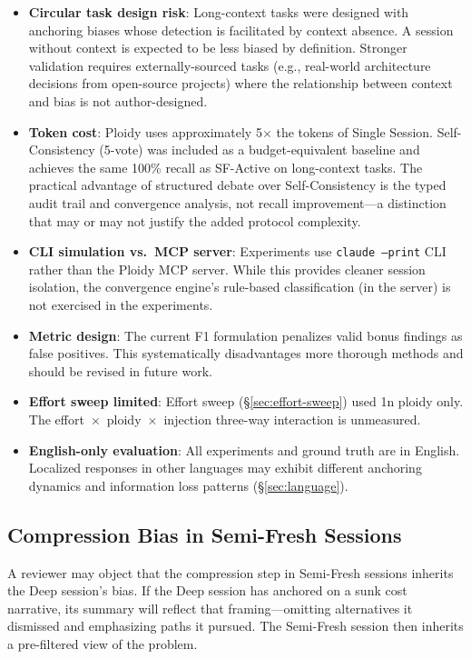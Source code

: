 \documentclass[11pt]{article}
\begin{document}
\begin{itemize}[leftmargin=1.5em]
  \item \textbf{Circular task design risk}: Long-context tasks were designed with anchoring biases whose detection is facilitated by context absence. A session without context is expected to be less biased by definition. Stronger validation requires externally-sourced tasks (e.g., real-world architecture decisions from open-source projects) where the relationship between context and bias is not author-designed.
  \item \textbf{Token cost}: Ploidy uses approximately 5$\times$ the tokens of Single Session. Self-Consistency (5-vote) was included as a budget-equivalent baseline and achieves the same 100\% recall as SF-Active on long-context tasks. The practical advantage of structured debate over Self-Consistency is the typed audit trail and convergence analysis, not recall improvement---a distinction that may or may not justify the added protocol complexity.
  \item \textbf{CLI simulation vs.\ MCP server}: Experiments use \texttt{claude --print} CLI rather than the Ploidy MCP server. While this provides cleaner session isolation, the convergence engine's rule-based classification (in the server) is not exercised in the experiments.
  \item \textbf{Metric design}: The current F1 formulation penalizes valid bonus findings as false positives. This systematically disadvantages more thorough methods and should be revised in future work.
  \item \textbf{Effort sweep limited}: Effort sweep (\S\ref{sec:effort-sweep}) used 1n ploidy only. The effort~$\times$~ploidy~$\times$~injection three-way interaction is unmeasured.
  \item \textbf{English-only evaluation}: All experiments and ground truth are in English. Localized responses in other languages may exhibit different anchoring dynamics and information loss patterns (\S\ref{sec:language}).
\end{itemize}

\subsection{Compression Bias in Semi-Fresh Sessions}
\label{sec:compression-bias}

A reviewer may object that the compression step in Semi-Fresh sessions inherits the Deep session's bias. If the Deep session has anchored on a sunk cost narrative, its summary will reflect that framing---omitting alternatives it dismissed and emphasizing paths it pursued. The Semi-Fresh session then inherits a pre-filtered view of the problem.
\end{document}
